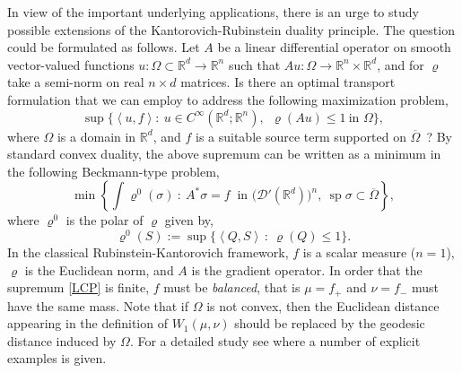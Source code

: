 \documentclass[11pt,letterpaper,reqno]{amsart}
\theoremstyle{definition}
\numberwithin{equation}{section}
\newcommand{\R}{\mathbb{R}}
\newcommand{\Rd}{\R^d}
\def\O{\Omega}
\newcommand{\Ob}{{\overline{\Omega}}}
\newcommand{\pairing}[1]{{\left \langle #1 \right \rangle}}
\newcommand{\D}{\mathcal{D}}
\DeclareMathOperator{\spt}{sp}
\begin{document}
In view of the important underlying applications, there is an urge to study possible extensions of the Kantorovich-Rubinstein duality principle. The question could be formulated as follows.
 Let $A$ be a linear differential operator on smooth vector-valued functions {$u:\O \subset\R^d \to \R^n$ such that $Au:\Omega \to \R^n \times \R^d$}, and for $\varrho$ take a semi-norm on real $n \times d$ matrices. Is there an optimal transport formulation that we can employ to address the following maximization problem,
\begin{equation} \label{LCP}
\sup\Big\{ \pairing{u,f} :\ u\in C^\infty(\R^d; \R^n),\ \ \varrho(Au)\le 1 \ \text{in $\O$}\Big\} ,
\end{equation}
 where $\O$ is a domain in $\R^d$, and $f$ is a suitable source term supported  on $\Ob$\nolinebreak\ ?  By standard  convex duality, the above supremum  can be written as a minimum in the following Beckmann-type problem,
 \begin{equation}\label{Beckman}
\min \left\{ \int \varrho^0(\sigma) \ :\ A^* \sigma= f \ \text{ in $\big(\D'(\Rd)\big)^n$}  ,\ \spt{\sigma}\subset\Ob\right\},
\end{equation}
 where $\varrho^0$ {is the polar} of $\varrho$ given by,
 \begin{equation}\label{dualnorm}
\varrho^0(S) := \sup \big\{ \pairing{Q,S}  \, :\ \varrho(Q)\le 1 \big\}.
\end{equation}
In the classical Rubinstein-Kantorovich framework, $f$ is a scalar measure ($n=1$), $\varrho$ is the Euclidean norm, and $A$ is the gradient operator. In order that the supremum  \eqref{LCP} is finite, $f$ must be  \textit{balanced}, that is $\mu=f_+$ and $\nu=f_-$ must have the same mass. Note that if $\O$ is not convex, then the Euclidean distance appearing in the definition of $W_1(\mu,\nu)$ should be replaced by the geodesic distance induced by $\O$. For a detailed study see \cite{bouchitte2001} where a number of explicit examples is given. 
\end{document}
